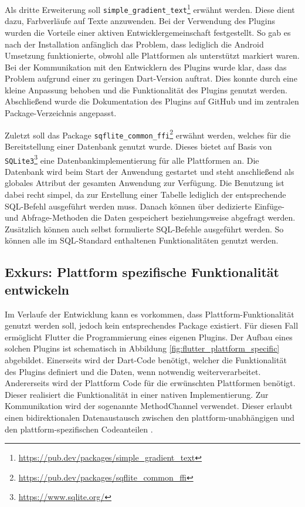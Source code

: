 Als dritte Erweiterung soll \verb|simple_gradient_text|\footnote{\url{https://pub.dev/packages/simple\_gradient\_text}} erwähnt werden. Diese dient dazu, Farbverläufe auf Texte anzuwenden. Bei der Verwendung des Plugins wurden die Vorteile einer aktiven Entwicklergemeinschaft festgestellt. So gab es nach der Installation anfänglich das Problem, dass lediglich die Android Umsetzung funktionierte, obwohl alle Plattformen als unterstützt markiert waren. Bei der Kommunikation mit den Entwicklern des Plugins wurde klar, dass das Problem aufgrund einer zu geringen Dart-Version auftrat. Dies konnte durch eine kleine Anpassung behoben und die Funktionalität des Plugins genutzt werden. Abschließend wurde die Dokumentation des Plugins auf GitHub und im zentralen Package-Verzeichnis angepasst.

Zuletzt soll das Package \verb|sqflite_common_ffi|\footnote{\url{https://pub.dev/packages/sqflite\_common\_ffi}} erwähnt werden, welches für die Bereitstellung einer Datenbank genutzt wurde. Dieses bietet auf Basis von \verb|SQLite3|\footnote{\url{https://www.sqlite.org/}} eine Datenbankimplementierung für alle Plattformen an.
Die Datenbank wird beim Start der Anwendung gestartet und steht anschließend als globales Attribut der gesamten Anwendung zur Verfügung.
Die Benutzung ist dabei recht simpel, da zur Erstellung einer Tabelle lediglich der entsprechende SQL-Befehl ausgeführt werden muss.
Danach können über dedizierte Einfüge- und Abfrage-Methoden die Daten gespeichert beziehungsweise abgefragt werden.
Zusätzlich können auch selbst formulierte SQL-Befehle ausgeführt werden. So können alle im SQL-Standard enthaltenen Funktionalitäten genutzt werden.


\subsection{Exkurs: Plattform spezifische Funktionalität entwickeln}
\label{cha:4_3_3}
Im Verlaufe der Entwicklung kann es vorkommen, dass Plattform-Funktionalität genutzt werden soll, jedoch kein entsprechendes Package existiert.
Für diesen Fall ermöglicht Flutter die Programmierung eines eigenen Plugins.
Der Aufbau eines solchen Plugins ist schematisch in Abbildung \ref{fig:flutter_plattform_specific} abgebildet. 
Einerseits wird der Dart-Code benötigt, welcher die Funktionalität des Plugins definiert und die Daten, wenn notwendig weiterverarbeitet. 
Andererseits wird der Plattform Code für die erwünschten Plattformen benötigt. Dieser realisiert die Funktionalität in einer nativen Implementierung.
Zur Kommunikation wird der sogenannte MethodChannel verwendet. Dieser erlaubt einen bidirektionalen Datenaustausch zwischen den plattform-unabhängigen und den plattform-spezifischen Codeanteilen \cite[Kapitel~12.3]{Flutter_Recipes}.

